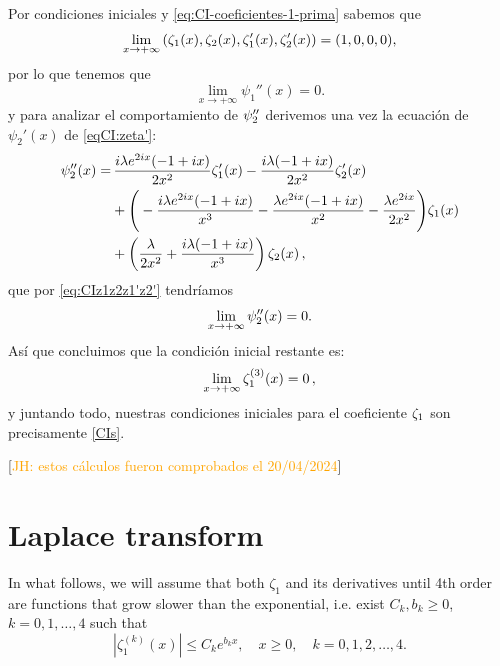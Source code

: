 \documentclass[%
 aip,
 jmp,%
 amsmath,amssymb,
 reprint,%
]{revtex4-2}
\begin{document}
Por condiciones iniciales y \eqref{eq:CI-coeficientes-1-prima} sabemos que
\begin{equation}\label{eq:CIz1z2z1'z2'}
    \lim_{x \to +\infty}\qty(\zeta_1(x),\zeta_2(x),\zeta'_1(x),\zeta'_2(x)) = (1,0,0,0),
\end{equation}
por lo que tenemos que
\begin{equation}
    \lim_{x \to +\infty} \psi_1''(x) = 0.
\end{equation}
y para analizar el comportamiento de $\psi_2''$ derivemos una vez la ecuación de $\psi_2'(x)$ de \eqref{eqCI:zeta'}:
\begin{equation}
    \begin{aligned}
        \psi_2''(x)=&\,\frac{i \lambda  e^{2 i x} (-1+i x)}{2 x^2}\zeta_1'(x)-\frac{i \lambda  (-1+i x) }{2 x^2}\zeta_2'(x)\\
        &+\Bigg(-\frac{i \lambda  e^{2 i x} (-1+i x)}{x^3}-\frac{\lambda  e^{2 i x} (-1+i x)}{x^2}-\frac{\lambda  e^{2 i x}}{2 x^2}\Bigg)\zeta_1(x) \\
        & +\left(\frac{\lambda }{2 x^2}+\frac{i \lambda  (-1+i x)}{x^3}\right)\zeta_2(x)\,,
    \end{aligned}
\end{equation}
que por \eqref{eq:CIz1z2z1'z2'} tendríamos
\begin{equation}
   \lim_{x \to +\infty} \psi_2''(x) = 0.
\end{equation}
Así que concluimos que la condición inicial restante es:
\begin{equation}
 \lim_{x\to +\infty}   \zeta_1^{(3)}(x)=0\,,
\end{equation}
y juntando todo, nuestras condiciones iniciales para el coeficiente $\zeta_1$ son precisamente \eqref{CIs}.

[\textcolor{orange}{JH: estos cálculos fueron comprobados el 20/04/2024}]






\section{Laplace transform}

In what follows, we will assume that both $\zeta_1$ and its derivatives until 4th order are functions that grow slower than the exponential, i.e. exist $C_k, b_k\geq 0$, $k=0,1,\ldots, 4$ such that
\[
|\zeta_1^{(k)}(x)| \le C_k e^{b_k x}, \quad x\ge 0, \quad k=0,1,2,\ldots, 4.
\]
\end{document}
